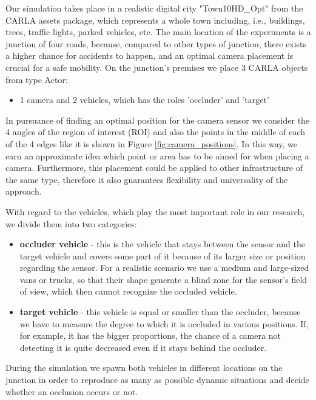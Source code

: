 Our simulation takes place in a realistic digital city "Town10HD\_Opt" from the CARLA assets package, which represents a whole town including, i.e., buildings, trees, traffic lights, parked vehicles, etc. The main location of the experiments is a junction of four roads, because, compared to other types of junction, there exists a higher chance for accidents to happen, and an optimal camera placement is crucial for a safe mobility. On the junction's premises we place 3 CARLA objects from type Actor: 
\begin{itemize}
    \item 1 camera and 2 vehicles, which has the roles 'occluder' and 'target'
\end{itemize}
In pursuance of finding an optimal position for the camera sensor we consider the 4 angles of the region of interest (ROI) and also the points in the middle of each of the 4 edges like it is shown in Figure \ref{fig:camera_positions}. In this way, we earn an approximate idea which point or area has to be aimed for when placing a camera. Furthermore, this placement could be applied to other infrastructure of the same type, therefore it also guarantees flexibility and universality of the approach. 

With regard to the vehicles, which play the most important role in our research, we divide them into two categories:

\begin{itemize}
    \item \textbf{occluder vehicle} - this is the vehicle that stays between the sensor and the target vehicle and covers some part of it because of its larger size or position regarding the sensor. For a realistic scenario we use a medium and large-sized vans or trucks, so that their shape generate a blind zone for the sensor's field of view, which then cannot recognize the occluded vehicle. 
    \item \textbf{target vehicle} - this vehicle is equal or smaller than the occluder, because we have to measure the degree to which it is occluded in various positions. If, for example, it has the bigger proportions, the chance of a camera not detecting it is quite decreased even if it stays behind the occluder. 
\end{itemize}
During the simulation we spawn both vehicles in different locations on the junction in order to reproduce as many as possible dynamic situations and decide whether an occlusion occurs or not.

